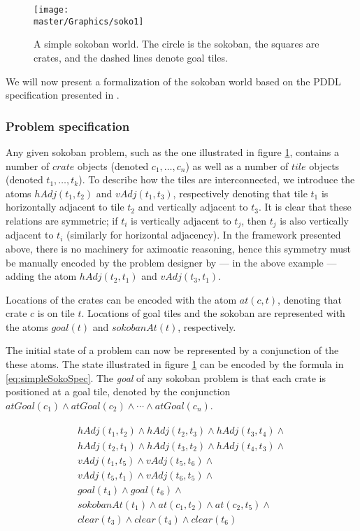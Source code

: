 \documentclass[../Master.tex]{subfiles}
\begin{document}
\begin{figure}
    \centering
    \texttt{[image: \\master/Graphics/soko1]}
    \caption{\label{fig:simpleSokoban} A simple sokoban world. The circle is the sokoban, the squares are crates, and the dashed lines denote goal tiles.}
\end{figure}

We will now present a formalization of the sokoban world based on the PDDL specification presented in \cite{BS2011}.

\subsubsection*{Problem specification}
Any given sokoban problem, such as the one illustrated in figure \ref{fig:simpleSokoban}, contains a number of $crate$ objects (denoted $c_1, \dots, c_n$) as well as a number of $tile$ objects (denoted $t_1, \dots, t_k$). To describe how the tiles are interconnected, we introduce the atoms $hAdj(t_1,t_2)$ and $vAdj(t_1,t_3)$, respectively denoting that tile $t_1$ is horizontally adjacent to tile $t_2$ and vertically adjacent to $t_3$. It is clear that these relations are symmetric; if $t_i$ is vertically adjacent to $t_j$, then $t_j$ is also vertically adjacent to $t_i$ (similarly for horizontal adjacency). In the framework presented above, there is no machinery for aximoatic reasoning, hence this symmetry must be manually encoded by the problem designer by --- in the above example --- adding the atom $hAdj(t_2,t_1)$ and $vAdj(t_3,t_1)$.

Locations of the crates can be encoded with the atom $at(c, t)$, denoting that crate $c$ is on tile $t$. Locations of goal tiles and the sokoban are represented with the atoms $goal(t)$ and $sokobanAt(t)$, respectively.

The initial state of a problem can now be represented by a conjunction of the these atoms. The state illustrated in figure \ref{fig:simpleSokoban} can be encoded by the formula in \eqref{eq:simpleSokoSpec}. The \textit{goal} of any sokoban problem is that each crate is positioned at a goal tile, denoted by the conjunction $atGoal(c_1) \land atGoal(c_2) \land \cdots \land atGoal(c_n)$.

\begin{gather}
\begin{gathered} \label{eq:simpleSokoSpec}
    hAdj(t_1, t_2) \land hAdj(t_2, t_3) \land hAdj(t_3, t_4) \land \\
    hAdj(t_2, t_1) \land hAdj(t_3, t_2) \land hAdj(t_4, t_3) \land \\
    vAdj(t_1, t_5) \land vAdj(t_5, t_6) \land \\
    vAdj(t_5, t_1) \land vAdj(t_6, t_5) \land \\
    goal(t_4) \land goal(t_6) \land \\
    sokobanAt(t_1) \land at(c_1, t_2) \land at(c_2, t_5) \land \\
    clear(t_3) \land clear(t_4) \land clear(t_6)
\end{gathered}
\end{gather}
\end{document}
